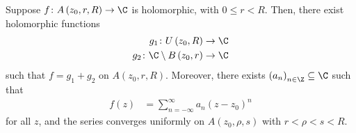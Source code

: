 \documentclass[10pt]{mypackage}
\begin{document}
\begin{proposition}
  Suppose $f\colon A\left( z_0,r,R \right)\rightarrow \C$ is holomorphic, with $0 \leq r < R$. Then, there exist holomorphic functions
  \begin{align*}
    g_1\colon U\left( z_0,R \right)\rightarrow \C\\
    g_2\colon \C\setminus B\left( z_0,r \right)\rightarrow \C
  \end{align*}
  such that $f = g_1 + g_2$ on $A\left( z_0,r,R \right)$. Moreover, there exists $\left( a_n \right)_{n\in\Z}\subseteq \C$ such that
  \begin{align*}
    f(z) &= \sum_{n=-\infty}^{\infty} a_n\left( z-z_0 \right)^{n}
  \end{align*}
  for all $z$, and the series converges uniformly on $A\left( z_0,\rho,s \right)$ with $r < \rho < s < R$.
\end{proposition}
\end{document}
